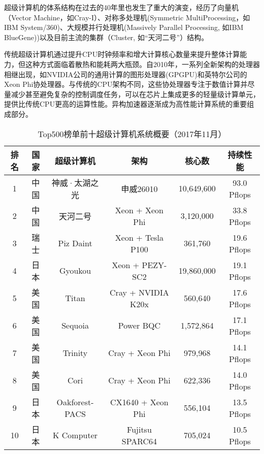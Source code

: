 超级计算机的体系结构在过去的40年里也发生了重大的演变，经历了向量机（Vector Machine，如Cray-I\cite{russell1978cray}）、对称多处理机(Symmetric MultiProcessing，如IBM System/360\cite{anderson1967ibm})、大规模并行处理机(Massively Parallel Processing, 如IBM BlueGene\cite{adiga2002overview}))以及目前主流的集群（Cluster, 如“天河二号”\cite{tianhe-2}）结构。

传统超级计算机通过提升CPU时钟频率和增大计算核心数量来提升整体计算能力，但这种方式面临着散热和能耗两大瓶颈。自2010年，一系列全新架构的处理器相继出现，如NVIDIA公司的通用计算的图形处理器\cite{nvidia2008programming}(GPGPU)和英特尔公司的Xeon Phi协处理器\cite{jeffers2013intel}。与传统的CPU架构不同，这些协处理器专注于数值计算并尽量减少甚至避免复杂的控制调度任务，可以在芯片上集成更多的轻量级计算单元，提供比传统CPU更高的运算性能。异构加速器逐渐成为高性能计算系统的重要组成部分。

\begin{table}[ht]
\centering
\caption{Top500榜单前十超级计算机系统概要（2017年11月）}
\label{tb:top500}
\begin{tabular}{cccccc}
\hline
排名 & 国家 & 超级计算机     & 架构               & 核心数      & 持续性能        \\ \hline
1  & 中国 & 神威·太湖之光     & 申威26010          & 10,649,600 & 93.0 Pflops \\ 
2  & 中国 & 天河二号        & Xeon + Xeon Phi    & 3,120,000  & 33.8 Pflops \\ 
3  & 瑞士 & Piz Daint      & Xeon + Tesla P100  & 361,760    & 19.6 Pflops \\ 
4  & 日本 & Gyoukou        & Xeon + PEZY-SC2    & 19,860,000 & 19.1 Pflops \\ 
5  & 美国 & Titan          & Cray + NVIDIA K20x & 560,640    & 17.6 Pflops \\ 
6  & 美国 & Sequoia        & Power BQC          & 1,572,864  & 17.1 Pflops \\ 
7  & 美国 & Trinity        & Cray + Xeon Phi    & 979,968    & 14.1 Pflops \\ 
8  & 美国 & Cori           & Cray + Xeon Phi    & 622,336    & 14.0 Pflops \\ 
9  & 日本 & Oakforest-PACS & CX1640 + Xeon Phi  & 556,104    & 13.5 Pflops \\ 
10 & 日本 & K Computer     & Fujitsu SPARC64     & 705,024    & 10.5 Pflops \\ 
\hline
\end{tabular}
\end{table}

